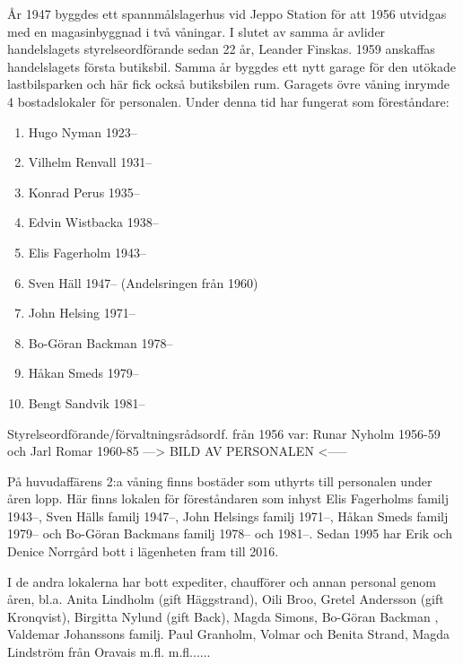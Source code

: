 År 1947 byggdes ett spannmålslagerhus vid Jeppo Station för att 1956 utvidgas med en magasinbyggnad i två våningar. I slutet av samma år avlider handelslagets styrelseordförande sedan 22 år, Leander Finskas. 1959 anskaffas handelslagets första butiksbil. Samma år byggdes ett nytt garage för den utökade lastbilsparken och här fick också butiksbilen rum. Garagets övre våning inrymde 4 bostadslokaler för personalen. Under denna tid har fungerat som föreståndare:
\begin{enumerate}
  \item Hugo Nyman        1923--
  \item Vilhelm Renvall   1931--
  \item Konrad Perus      1935--
  \item Edvin Wistbacka   1938--
  \item Elis Fagerholm    1943--
  \item Sven Häll         1947-- (Andelsringen från 1960)
  \item John Helsing      1971--
  \item Bo-Göran Backman  1978--
  \item Håkan Smeds       1979--
  \item Bengt Sandvik     1981--
\end{enumerate}

Styrelseordförande/förvaltningsrådsordf. från 1956 var: Runar Nyholm 1956-59 och Jarl Romar 1960-85   ---> BILD AV PERSONALEN <-----

På huvudaffärens 2:a våning finns bostäder som uthyrts till personalen under åren lopp. Här finns lokalen för föreståndaren som inhyst Elis Fagerholms familj 1943--, Sven Hälls familj 1947--, John Helsings familj 1971--, Håkan Smeds familj 1979-- och Bo-Göran Backmans familj 1978-- och 1981--. Sedan 1995 har Erik och Denice Norrgård bott i lägenheten fram till 2016.

I de andra lokalerna har bott expediter, chaufförer och annan personal genom åren, bl.a. Anita Lindholm (gift Häggstrand), Oili Broo, Gretel Andersson (gift Kronqvist), Birgitta Nylund (gift Back), Magda Simons, Bo-Göran Backman , Valdemar Johanssons familj. Paul Granholm, Volmar och Benita Strand, Magda Lindström från Oravais m.fl. m.fl......

